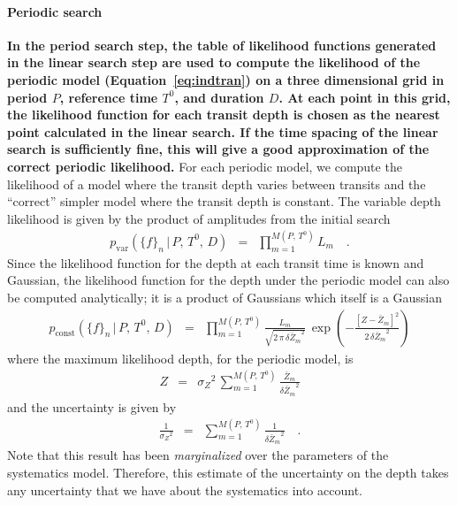 \documentclass[12pt,preprint]{aastex}
\newcommand{\eqalt}[1]{Equation~\ref{eq:#1}}
\newcommand{\eqlabel}[1]{\label{eq:#1}}
\newcommand{\response}[1]{{\color{mygreen} {\bf #1}}}
\newcommand{\flux}{{\ensuremath{f}}}
\newcommand{\period}{{\ensuremath{P}}}
\newcommand{\phase}{{\ensuremath{T^0}}}
\newcommand{\duration}{{\ensuremath{D}}}
\newcommand{\depth}{{\ensuremath{Z}}}
\begin{document}
\paragraph{Periodic search}

\response{%
In the period search step, the table of likelihood functions generated in the
linear search step are used to compute the likelihood of the periodic model
(\eqalt{indtran}) on a three dimensional grid in period \period, reference
time \phase, and duration \duration.
At each point in this grid, the likelihood function for each transit depth is
chosen as the nearest point calculated in the linear search.
If the time spacing of the linear search is sufficiently fine, this will give
a good approximation of the correct periodic likelihood.}
For each periodic model, we compute the likelihood of a model where the
transit depth varies between transits and the ``correct'' simpler model where
the transit depth is constant.
The variable depth likelihood is given by the product of amplitudes from the
initial search
\begin{eqnarray}
p_\mathrm{var}(\{\flux\}_n\,|\,\period,\,\phase,\,\duration) &=&
\prod_{m=1}^{M(\period,\,\phase)} L_m \quad.
\end{eqnarray}
Since the likelihood function for the depth at each transit time is known and
Gaussian, the likelihood function for the depth under the periodic model can
also be computed analytically; it is a product of Gaussians which itself is a
Gaussian
\begin{eqnarray}
p_\mathrm{const}(\{\flux\}_n\,|\,\period,\,\phase,\,\duration) &=&
\prod_{m=1}^{M(\period,\,\phase)}
    \frac{L_m}{\sqrt{2\,\pi\,{\delta\bar{\depth}_m}^2}}\,\exp \left(
        -\frac{[\depth - \bar{\depth}_m]^2}{2\,{\delta\bar{\depth}_m}^2}
    \right)
\end{eqnarray}
where the maximum likelihood depth, for the periodic model, is
\begin{eqnarray}\eqlabel{periodic-depth}
\depth &=& {\sigma_\depth}^2\,\sum_{m=1}^{M(\period,\,\phase)}
    \frac{\bar{\depth}_m}{{\delta\bar{\depth}_m}^2}
\end{eqnarray}
and the uncertainty is given by
\begin{eqnarray}\eqlabel{periodic-depth-uncert}
\frac{1}{{\sigma_\depth}^2} &=& \sum_{m=1}^{M(\period,\,\phase)}
    \frac{1}{{\delta\bar{\depth}_m}^2} \quad.
\end{eqnarray}
Note that this result has been \emph{marginalized} over the parameters of the
systematics model.
Therefore, this estimate of the uncertainty on the depth takes any
uncertainty that we have about the systematics into account.
\end{document}
